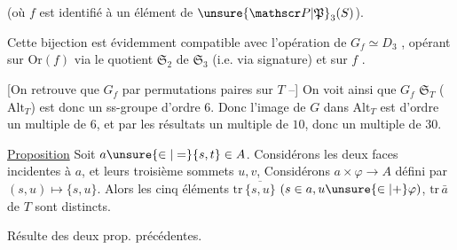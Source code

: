 (où $f$ est identifié à un élément de $\unsure{\mathscr P|\mathfrak P}_3(S)$).

Cette bijection est évidemment compatible avec l'opération de $G_f\simeq D_3$ , opérant sur  $\mathrm{Or}(f)$ via le quotient $\mathfrak S_2$ de $\mathfrak S_3$ (i.e. via signature) et sur $f$ .

 [On retrouve que $G_f$   par permutations paires sur $T$ --] On voit ainsi que  $G_f$   $\mathfrak S_T$ ( $\mathrm{Alt}_T$) est donc un ss-groupe d'ordre $6$. Donc l'image de $G$ dans $\mathrm{Alt}_T$ est d'ordre un multiple de $6$, et par les résultats  un multiple de $10$, donc un multiple de $30$.

\uline{Proposition} Soit $a\unsure{\in|=}\{s,t\}\in A$. Considérons  les deux faces incidentes à $a$, et  leurs troisième sommets $u,v$,   Considérons $a\times\varphi\longrightarrow A$ défini par $(s,u)\longmapsto\{s,u\}$. Alors les cinq éléments $\mathrm{tr}\,\overline{\{s,u\}}$ $(s\in a,u\unsure{\in|+}\varphi)$, $\mathrm{tr}\,\bar a$ de $T$ sont distincts.

Résulte des deux prop. précédentes.
